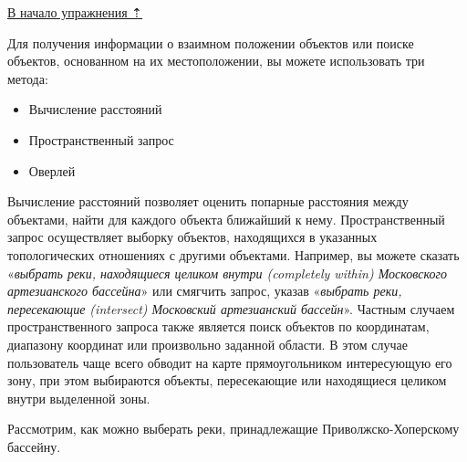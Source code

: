 \documentclass[]{book}
\providecommand{\tightlist}{%
  \setlength{\itemsep}{0pt}\setlength{\parskip}{0pt}}
\theoremstyle{definition}
\theoremstyle{definition}
\theoremstyle{definition}
\theoremstyle{remark}
\begin{document}
\protect\hyperlink{map-ref-hydrogeologic}{В начало упражнения ⇡}

Для получения информации о взаимном положении объектов или поиске
объектов, основанном на их местоположении, вы можете использовать три
метода:

\begin{itemize}
\tightlist
\item
  Вычисление расстояний
\item
  Пространственный запрос
\item
  Оверлей
\end{itemize}

Вычисление расстояний позволяет оценить попарные расстояния между
объектами, найти для каждого объекта ближайший к нему. Пространственный
запрос осуществляет выборку объектов, находящихся в указанных
топологических отношениях с другими объектами. Например, вы можете
сказать «\emph{выбрать реки, находящиеся целиком внутри (completely
within) Московского артезианского бассейна}» или смягчить запрос, указав
«\emph{выбрать реки, пересекающие (intersect) Московский артезианский
бассейн}». Частным случаем пространственного запроса также является
поиск объектов по координатам, диапазону координат или произвольно
заданной области. В этом случае пользователь чаще всего обводит на карте
прямоугольником интересующую его зону, при этом выбираются объекты,
пересекающие или находящиеся целиком внутри выделенной зоны.

Рассмотрим, как можно выберать реки, принадлежащие Приволжско-Хоперскому
бассейну.
\end{document}
